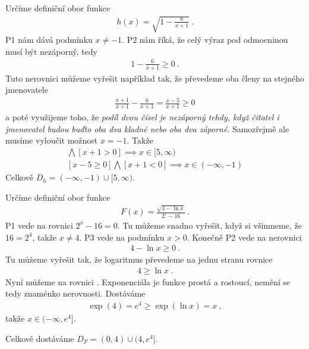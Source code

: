 \begin{example}
    Určíme definiční obor funkce \begin{align}
        h(x) = \sqrt{1 - \frac{6}{x+1}} \:.
    \end{align}
    P1 nám dává podmínku $x \neq -1$. P2 nám říká, že celý výraz pod odmocninou musí být nezáporný, tedy \begin{align}
        1 - \frac{6}{x+1} \geq 0 \:.
    \end{align}
    Tuto nerovnici můžeme vyřešit například tak, že převedeme oba členy na stejného jmenovatele
    \begin{align}
        \frac{x+1}{x+1} - \frac{6}{x+1} = \frac{x-5}{x+1} \geq 0
    \end{align}
    a poté využijeme toho, že \textit{podíl dvou čísel je nezáporný tehdy, když čitatel i jmenovatel budou buďto oba dva kladné nebo oba dva záporné}. Samozřejmě ale musíme vyloučit možnost $x=-1$. Takže \begin{align}
        [x-5 \leq 0] \bigwedge [x+1 > 0] \implies x \in [5,\infty) \\
        [x-5 \geq 0] \bigwedge [x+1 < 0] \implies x \in (-\infty,-1) 
    \end{align}
    Celkově $D_h = (-\infty, -1) \cup [5,\infty)$.
\end{example}

\begin{example}
    Určíme definiční obor funkce \begin{align}
        F(x) = \frac{\sqrt{4-\ln x}}{2^x - 16} \:.
    \end{align}
    P1 vede na rovnici $2^x - 16 = 0$. Tu můžeme snadno vyřešit, když si všimneme, že $16 = 2^4$, takže $x \neq 4$.
    P3 vede na podmínku $x>0$. Konečně P2 vede na nerovnici \begin{align}
        4 - \ln x \geq 0 \:.
    \end{align}
    Tu můžeme vyřešit tak, že logaritmus převedeme na jednu stranu rovnice
    \begin{align}
        4 \geq \ln x \:.
    \end{align}
    Nyní můžeme na rovnici . Exponenciála je funkce prostá a rostoucí, nemění se tedy znaménko nerovnosti. Dostáváme \begin{align}
        \exp(4) = e^4 \geq \exp(\ln x) = x \:,
    \end{align}
    takže $x \in (-\infty, e^4]$.
    
    Celkově dostáváme $D_F = (0,4)\cup(4,e^4]$.
\end{example}

